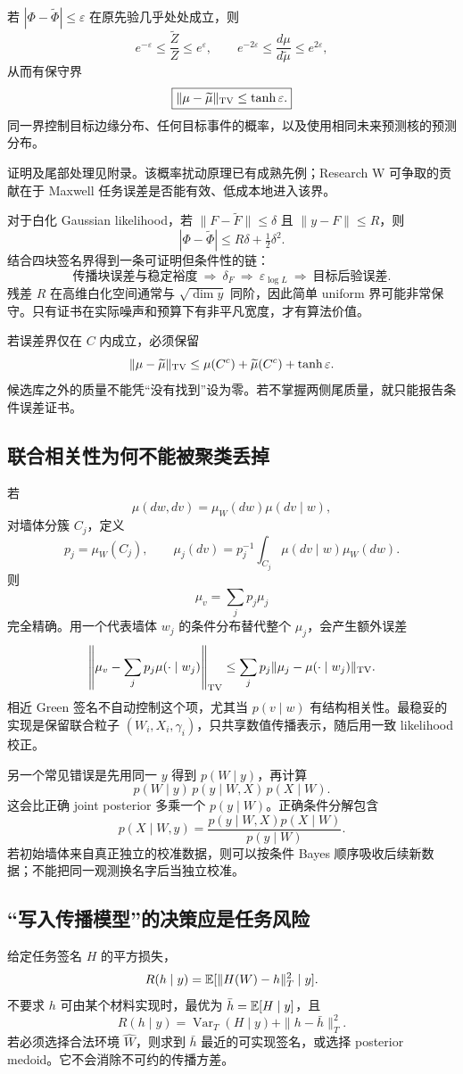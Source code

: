 \begin{proposition}[联合测度不变时的概率误差]
若 $|\Phi-\widetilde\Phi|\le\varepsilon$ 在原先验几乎处处成立，则
\[
e^{-\varepsilon}\le\frac{\widetilde Z}{Z}\le e^\varepsilon,
\qquad e^{-2\varepsilon}\le\frac{d\mu}{d\widetilde\mu}\le e^{2\varepsilon},
\]
从而有保守界
\[
\boxed{\|\mu-\widetilde\mu\|_{\operatorname{TV}}\le\tanh\varepsilon.}
\]
同一界控制目标边缘分布、任何目标事件的概率，以及使用相同未来预测核的预测分布。
\end{proposition}
证明及尾部处理见附录。该概率扰动原理已有成熟先例；Research W 可争取的贡献在于 Maxwell 任务误差是否能有效、低成本地进入该界。\cite{L_Cotter,L_Lie,L_Zahm}

对于白化 Gaussian likelihood，若
$\|F-\widetilde F\|\le\delta$ 且 $\|y-F\|\le R$，则
\[
|\Phi-\widetilde\Phi|\le R\delta+\tfrac12\delta^2.
\]
结合四块签名界得到一条可证明但条件性的链：
\[
\text{传播块误差与稳定裕度}
\ \Longrightarrow\ \delta_F
\ \Longrightarrow\ \varepsilon_{\log L}
\ \Longrightarrow\ \text{目标后验误差}.
\]
残差 $R$ 在高维白化空间通常与 $\sqrt{\dim y}$ 同阶，因此简单 uniform 界可能非常保守。只有证书在实际噪声和预算下有非平凡宽度，才有算法价值。

若误差界仅在 $C$ 内成立，必须保留
\[
\|\mu-\widetilde\mu\|_{\operatorname{TV}}\le
\mu(C^c)+\widetilde\mu(C^c)+\tanh\varepsilon.
\]
候选库之外的质量不能凭“没有找到”设为零。若不掌握两侧尾质量，就只能报告条件误差证书。

\subsection{联合相关性为何不能被聚类丢掉}
若
\[
\mu(dw,dv)=\mu_W(dw)\mu(dv\mid w),
\]
对墙体分簇 $C_j$，定义
\[
p_j=\mu_W(C_j),\qquad
\mu_j(dv)=p_j^{-1}\!\int_{C_j}\mu(dv\mid w)\mu_W(dw).
\]
则
\[
\mu_v=\sum_jp_j\mu_j
\]
完全精确。用一个代表墙体 $w_j$ 的条件分布替代整个 $\mu_j$，会产生额外误差
\[
\left\|\mu_v-\sum_jp_j\mu(\cdot\mid w_j)\right\|_{\operatorname{TV}}
\le\sum_jp_j\|\mu_j-\mu(\cdot\mid w_j)\|_{\operatorname{TV}}.
\]
相近 Green 签名不自动控制这个项，尤其当 $p(v\mid w)$ 有结构相关性。最稳妥的实现是保留联合粒子 $(W_i,X_i,\gamma_i)$，只共享数值传播表示，随后用一致 likelihood 校正。

另一个常见错误是先用同一 $y$ 得到 $p(W\mid y)$，再计算
\[
p(W\mid y)\,p(y\mid W,X)\,p(X\mid W).
\]
这会比正确 joint posterior 多乘一个 $p(y\mid W)$。正确条件分解包含
\[
p(X\mid W,y)=
\frac{p(y\mid W,X)p(X\mid W)}{p(y\mid W)}.
\]
若初始墙体来自真正独立的校准数据，则可以按条件 Bayes 顺序吸收后续新数据；不能把同一观测换名字后当独立校准。

\subsection{“写入传播模型”的决策应是任务风险}
给定任务签名 $H$ 的平方损失，
\[
R(h\mid y)=\mathbb E[\|H(W)-h\|_T^2\mid y].
\]
不要求 $h$ 可由某个材料实现时，最优为 $\bar h=\mathbb E[H\mid y]$，且
\[
R(h\mid y)=\operatorname{Var}_T(H\mid y)+\|h-\bar h\|_T^2.
\]
若必须选择合法环境 $\widehat W$，则求到 $\bar h$ 最近的可实现签名，或选择 posterior medoid。它不会消除不可约的传播方差。

